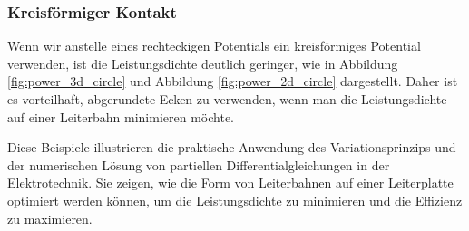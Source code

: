 \subsubsection{Kreisförmiger Kontakt}
Wenn wir anstelle eines rechteckigen Potentials ein kreisförmiges Potential verwenden, ist die Leistungsdichte deutlich geringer, wie in Abbildung \ref{fig:power_3d_circle} und Abbildung \ref{fig:power_2d_circle} dargestellt. Daher ist es vorteilhaft, abgerundete Ecken zu verwenden, wenn man die Leistungsdichte auf einer Leiterbahn minimieren möchte.

Diese Beispiele illustrieren die praktische Anwendung des
Variationsprinzips und der numerischen Lösung von partiellen
Differentialgleichungen in der Elektrotechnik. Sie zeigen, wie die
Form von Leiterbahnen auf einer Leiterplatte optimiert werden können,
um die Leistungsdichte zu minimieren und die Effizienz zu maximieren.
